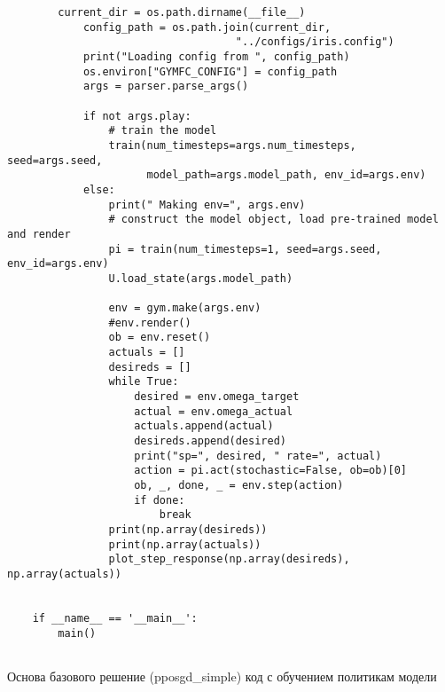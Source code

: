 \begin{verbatim}
        current_dir = os.path.dirname(__file__)
            config_path = os.path.join(current_dir,
                                    "../configs/iris.config")
            print("Loading config from ", config_path)
            os.environ["GYMFC_CONFIG"] = config_path
            args = parser.parse_args()

            if not args.play:
                # train the model
                train(num_timesteps=args.num_timesteps, seed=args.seed, 
                      model_path=args.model_path, env_id=args.env)
            else:
                print(" Making env=", args.env)
                # construct the model object, load pre-trained model and render
                pi = train(num_timesteps=1, seed=args.seed, env_id=args.env)
                U.load_state(args.model_path)

                env = gym.make(args.env)
                #env.render()
                ob = env.reset()
                actuals = []
                desireds = []
                while True:
                    desired = env.omega_target
                    actual = env.omega_actual
                    actuals.append(actual)
                    desireds.append(desired)
                    print("sp=", desired, " rate=", actual)
                    action = pi.act(stochastic=False, ob=ob)[0]
                    ob, _, done, _ = env.step(action)
                    if done:
                        break
                print(np.array(desireds))
                print(np.array(actuals))
                plot_step_response(np.array(desireds), np.array(actuals))


    if __name__ == '__main__':
        main()


\end{verbatim}

Основа базового решение (pposgd\_simple)
код с обучением политикам модели

